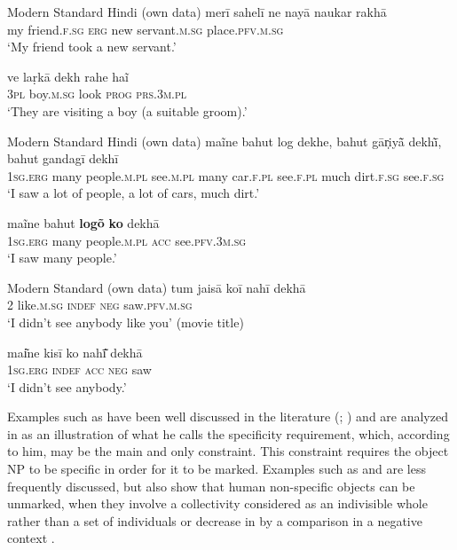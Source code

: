 \documentclass[output=paper]{LSP/langsci}
\begin{document}
\ea Modern Standard Hindi (own data)  \label{10-mo-ex:4}
\ea \label{10-mo-ex:4a}
\gll merī sahelī ne nayā naukar rakhā\\
 my friend.\textsc{f.sg} \textsc{erg} new servant.\textsc{m.sg} place.\textsc{pfv.m.sg}\\
\glt ‘My friend took a new servant.’

\ex  \label{10-mo-ex:4b}
\gll ve laṛkā dekh rahe haĩ\\
 \textsc{3pl} boy.\textsc{m.sg} look \textsc{prog} \textsc{prs.3m.pl}\\
\glt ‘They are visiting a boy (a suitable groom).’
\z
\z

\ea Modern Standard Hindi (own data)  \label{10-mo-ex:5}
\ea \label{10-mo-ex:5a}
\gll maĩne bahut log dekhe, bahut gār̩iyā̃ 	dekhī̃,  bahut gandagī dekhī\\
\textsc{1sg.erg} many people.\textsc{m.pl} see.\textsc{m.pl} many car.\textsc{f.pl} see.\textsc{f.pl} much dirt.\textsc{f.sg} see.\textsc{f.sg}\\
\glt ‘I saw a lot of people, a lot of cars, much dirt.’

\ex  \label{10-mo-ex:5b}
\gll maĩne bahut \textbf{logõ} \textbf{ko} dekhā\\
\textsc{1sg.erg} many people.\textsc{m.pl} \textsc{acc} see.\textsc{pfv.3m.sg}\\
\glt ‘I saw many people.’ 
\z
\z

\ea Modern Standard  (own data) 
\label{10-mo-ex:6}
\ea  \label{10-mo-ex:6a}
\gll tum jaisā koī nahī dekhā\\
 2 like.\textsc{m.sg} \textsc{indef} \textsc{neg} saw.\textsc{pfv.m.sg}\\
\glt ‘I didn’t see anybody like you’ (movie title)

\ex  \label{10-mo-ex:6b}
\gll mai͂ne kisī ko nahī͂ dekhā\\
 \textsc{1sg.erg} \textsc{indef} \textsc{acc} \textsc{neg} saw\\
\glt ‘I didn’t see anybody.’
\z
\z

Examples such as  have been well discussed in the literature (\citealt{Mohanan1994Argument}; \citealt{Dayal2011Hindi}) and are analyzed in \citet{Self2012Differential} as an illustration of what he calls the specificity requirement, which, according to him, may be the main and only constraint. This constraint requires the object NP to be specific in order for it to be marked. Examples such as  and  are less frequently discussed, but also show that human non-specific objects can be unmarked, when they involve a collectivity considered as an indivisible whole  rather than a set of individuals  or decrease in  by a comparison in a negative context .
\end{document}
